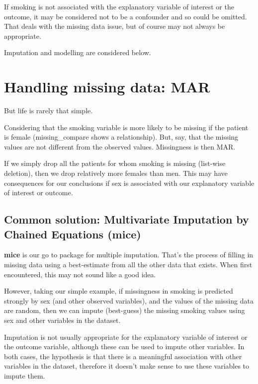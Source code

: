\documentclass[
  12pt,
  krantz2]{krantz}
\begin{document}
If smoking is not associated with the explanatory variable of interest or the outcome, it may be considered not to be a confounder and so could be omitted.
That deals with the missing data issue, but of course may not always be appropriate.

Imputation and modelling are considered below.

\hypertarget{handling-missing-data-mar}{%
\section{Handling missing data: MAR}\label{handling-missing-data-mar}}

But life is rarely that simple.

Considering that the smoking variable is more likely to be missing if the patient is female (missing\_compare shows a relationship).
But, say, that the missing values are not different from the observed values.
Missingness is then MAR.

If we simply drop all the patients for whom smoking is missing (list-wise deletion), then we drop relatively more females than men.
This may have consequences for our conclusions if sex is associated with our explanatory variable of interest or outcome.

\hypertarget{common-solution-multivariate-imputation-by-chained-equations-mice}{%
\subsection{Common solution: Multivariate Imputation by Chained Equations (mice)}\label{common-solution-multivariate-imputation-by-chained-equations-mice}}


\textbf{mice} is our go to package for multiple imputation.
That's the process of filling in missing data using a best-estimate from all the other data that exists.
When first encountered, this may not sound like a good idea.

However, taking our simple example, if missingness in smoking is predicted strongly by sex (and other observed variables), and the values of the missing data are random, then we can impute (best-guess) the missing smoking values using sex and other variables in the dataset.

Imputation is not usually appropriate for the explanatory variable of interest or the outcome variable, although these can be used to impute other variables.
In both cases, the hypothesis is that there is a meaningful association with other variables in the dataset, therefore it doesn't make sense to use these variables to impute them.
\end{document}
